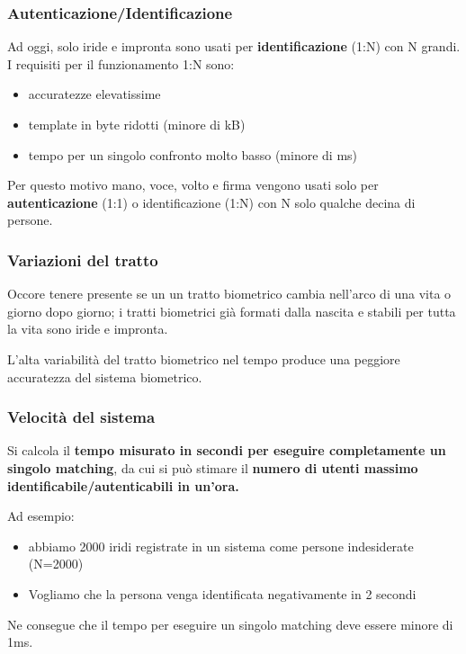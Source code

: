 \subsubsection{Autenticazione/Identificazione}

Ad oggi, solo iride e impronta sono usati per \textbf{identificazione} (1:N) con N grandi. I requisiti per il funzionamento 1:N sono:
\begin{itemize}
    \item accuratezze elevatissime
    \item template in byte ridotti (minore di kB)
    \item tempo per un singolo confronto molto basso (minore di ms)
\end{itemize}

Per questo motivo mano, voce, volto e firma vengono usati solo per \textbf{autenticazione} (1:1) o identificazione (1:N) con N solo qualche decina di persone.

\subsubsection{Variazioni del tratto}

Occore tenere presente se un un tratto biometrico cambia nell'arco di una vita o giorno dopo giorno; i tratti biometrici già formati dalla nascita e stabili per tutta la vita sono iride e impronta.

L'alta variabilità del tratto biometrico nel tempo produce una peggiore accuratezza del sistema biometrico.

\subsubsection{Velocità del sistema}

Si calcola il \textbf{tempo misurato in secondi per eseguire completamente un singolo matching}, da cui si può stimare il \textbf{numero di utenti massimo identificabile/autenticabili in un'ora.}

Ad esempio:
\begin{itemize}
    \item abbiamo 2000 iridi registrate in un sistema come persone indesiderate (N=2000)
    \item Vogliamo che la persona venga identificata negativamente in 2 secondi
\end{itemize}
Ne consegue che il tempo per eseguire un singolo matching deve essere minore di 1ms.

